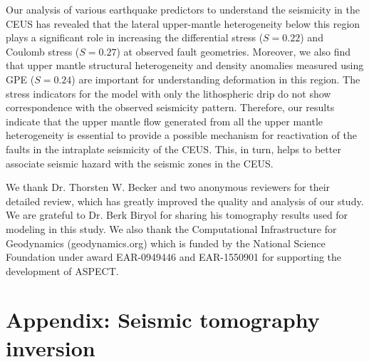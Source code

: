 \documentclass[draft,linenumbers]{agujournal2018}
\begin{document}
Our analysis of various earthquake predictors to understand the seismicity in the CEUS has revealed that the lateral upper-mantle heterogeneity below this region plays a significant role in increasing the differential stress ($S=0.22$) and Coulomb stress ($S=0.27$) at observed fault geometries. Moreover, we also find that upper mantle structural heterogeneity and density anomalies measured using GPE ($S=0.24$) are important for understanding deformation in this region. The stress indicators for the model with only the lithospheric drip do not show correspondence with the observed seismicity pattern. Therefore, our results indicate that the upper mantle flow generated from all the upper mantle heterogeneity is essential to provide a possible mechanism for reactivation of the faults in the intraplate seismicity of the CEUS. This, in turn, helps to better associate seismic hazard with the seismic zones in the CEUS.

\acknowledgments
 We thank Dr. Thorsten W. Becker and two anonymous reviewers for their detailed review, which has greatly improved the quality and analysis of our study. We are grateful to Dr. Berk Biryol for sharing his tomography results used for modeling in this study. We also thank the Computational Infrastructure for Geodynamics (geodynamics.org) which is funded by the National Science Foundation under award EAR-0949446 and EAR-1550901 for supporting the development of ASPECT.



\appendix
\section{Appendix: Seismic tomography inversion}
\end{document}
